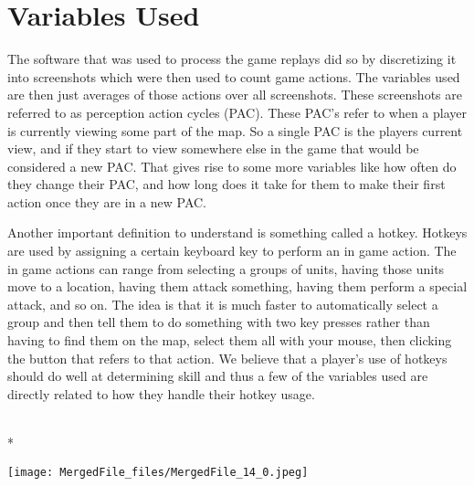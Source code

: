 \documentclass[letterpaper,10pt,english]{/usr/share/sphinx/texinputs/sphinxhowto}
\def\smaller{\fontsize{9.5pt}{9.5pt}\selectfont}
\newenvironment{InvisibleVerbatim}
        {\begin{mdframed}[leftmargin=0.1\linewidth,innerleftmargin=3pt,innerrightmargin=3pt, userdefinedwidth=1\linewidth, linewidth=0pt, linecolor=white, usetwoside=false]}
        {\end{mdframed}}
\begin{document}
        
    
\part{Variables Used}The software that was used to process the game replays did so by
discretizing it into screenshots which were then used to count game
actions. The variables used are then just averages of those actions over
all screenshots. These screenshots are referred to as perception action
cycles (PAC). These PAC's refer to when a player is currently viewing
some part of the map. So a single PAC is the players current view, and
if they start to view somewhere else in the game that would be
considered a new PAC. That gives rise to some more variables like how
often do they change their PAC, and how long does it take for them to
make their first action once they are in a new PAC.

Another important definition to understand is something called a hotkey.
Hotkeys are used by assigning a certain keyboard key to perform an in
game action. The in game actions can range from selecting a groups of
units, having those units move to a location, having them attack
something, having them perform a special attack, and so on. The idea is
that it is much faster to automatically select a group and then tell
them to do something with two key presses rather than having to find
them on the map, select them all with your mouse, then clicking the
button that refers to that action. We believe that a player's use of
hotkeys should do well at determining skill and thus a few of the
variables used are directly related to how they handle their hotkey
usage.

    

        
        

            
                \makebox[0.1\linewidth]{\smaller\hfill\tt\color{nbframe-out-prompt}Out\hspace{4pt}{[}33{]}:\hspace{4pt}}\\*
                \vspace{-2.55\baselineskip}\begin{InvisibleVerbatim}
                \vspace{-0.5\baselineskip}
    \begin{center}
    \texttt{[image: MergedFile\_files/MergedFile\_14\_0.jpeg]}
    \par
    \end{center}
    
            \end{InvisibleVerbatim}
            
\end{document}
